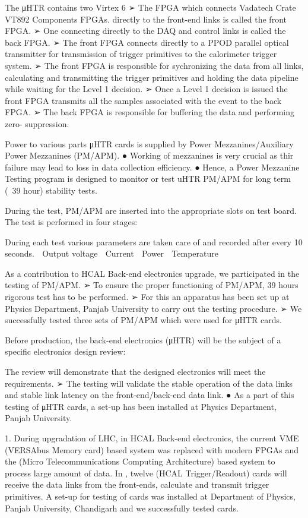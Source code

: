 The μHTR contains two Virtex 6
➢ The FPGA which connects
Vadatech Crate VT892
Components
FPGAs.
directly to the front-end links is called the front
FPGA.
➢ One connecting directly to the DAQ and control links is called the back FPGA.
➢ The front FPGA connects directly to a PPOD parallel optical transmitter for
transmission of trigger primitives to the calorimeter trigger system.
➢ The front FPGA is responsible for sychronizing the data from all links,
calculating and transmitting the trigger primitives and holding the data pipeline
while waiting for the Level 1 decision.
➢ Once a Level 1 decision is issued the front FPGA transmits all the samples
associated with the event to the back FPGA.
➢ The back FPGA is responsible for buffering the data and performing zero-
suppression.

Power
to various parts μHTR cards is supplied by Power
Mezzanines/Auxiliary Power Mezzanines (PM/APM).
● Working of mezzanines is very crucial as thir failure may lead to loss in
data collection efficiency.
● Hence, a Power Mezzanine Testing program is designed to monitor or test
uHTR PM/APM for long term (~39 hour) stability tests.


During
the test, PM/APM are inserted into the appropriate slots on test
board. The test is performed in four stages:

During
each test various parameters are taken care of and recorded after
every 10 seconds.
 Output voltage
 Current
 Power
 Temperature

As
a contribution to HCAL Back-end electronics upgrade, we participated
in the testing of PM/APM.
➢ To
ensure the proper functioning of PM/APM, 39 hours rigorous test
has to be performed.
➢ For this an apparatus has been set up at Physics Department, Panjab
University to carry out the testing procedure.
➢ We successfully tested three sets of PM/APM which were used for
μHTR cards.

Before
production, the back-end electronics (μHTR) will be the subject of a
specific electronics design review:

The
review will demonstrate that the designed electronics will meet the
requirements.
➢ The testing will validate the stable operation of the data links and
stable link latency on the front-end/back-end data link.
● As
a part of this testing of μHTR cards, a set-up has been installed at
Physics Department, Panjab University.


1. During upgradation of LHC, in HCAL Back-end electronics, the current VME (VERSAbus Memory card) based system was replaced with modern FPGAs and the \mtca (Micro Telecommunications Computing Architecture) based system to process large amount of data. In \mtca, twelve \mhtr (HCAL Trigger/Readout) cards will receive the data links from the front-ends, calculate and transmit trigger primitives. A set-up for testing of \mhtr cards was installed at Department of Physics, Panjab University, Chandigarh and we successfully tested \mhtr cards. 

